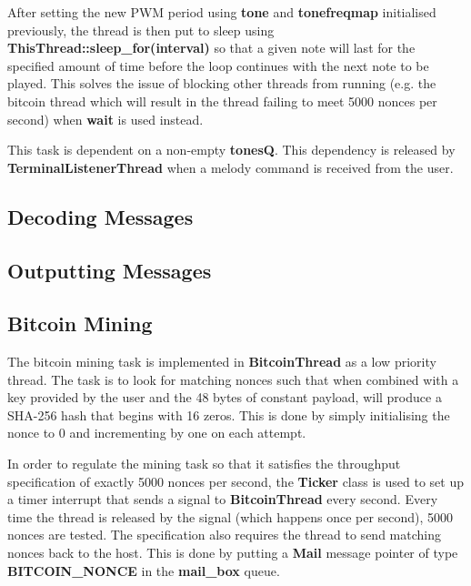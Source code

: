 \documentclass{article}
\begin{document}
\bigskip

After setting the new PWM period using \textbf{tone} and \textbf{tonefreqmap} initialised previously, the thread is then put to sleep using \textbf{ThisThread::sleep\_for(interval)} so that a given note will last for the specified amount of time before the loop continues with the next note to be played. This solves the issue of blocking other threads from running (e.g. the bitcoin thread which will result in the thread failing to meet 5000 nonces per second) when \textbf{wait} is used instead.   

\bigskip

This task is dependent on a non-empty \textbf{tonesQ}. This dependency is released by \textbf{TerminalListenerThread} when a melody command is received from the user. 

\subsection{Decoding Messages}

\subsection{Outputting Messages}

\subsection{Bitcoin Mining}

The bitcoin mining task is implemented in \textbf{BitcoinThread} as a low priority thread. The task is to look for matching nonces such that when combined with a key provided by the user and the 48 bytes of constant payload, will produce a SHA-256 hash that begins with 16 zeros. This is done by simply initialising the nonce to 0 and incrementing by one on each attempt. 

\bigskip

In order to regulate the mining task so that it satisfies the throughput specification of exactly 5000 nonces per second, the \textbf{Ticker} class is used to set up a timer interrupt that sends a signal to \textbf{BitcoinThread} every second. Every time the thread is released by the signal (which happens once per second), 5000 nonces are tested. The specification also requires the thread to send matching nonces back to the host. This is done by putting a \textbf{Mail} message pointer of type \textbf{BITCOIN\_NONCE} in the \textbf{mail\_box} queue. 
\end{document}
